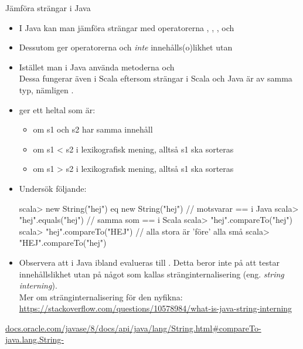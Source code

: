\begin{Slide}{Jämföra strängar i Java}\SlideFontTiny
\begin{itemize}
\item I Java kan man  jämföra strängar med operatorerna \code{<}, \code{<=}, \code{>}, och \code{>=}

\item Dessutom ger operatorerna \code{==} och \code{!=} \emph{inte} innehålls(o)likhet utan  \code{:(}

\item Istället  man i Java använda metoderna  och 
\\Dessa fungerar även i Scala eftersom strängar i Scala och Java är av samma typ, nämligen .
\pause
\item {} ger ett heltal som är:
\begin{itemize}\SlideFontTiny
\item {} om s1 och s2 har samma innehåll
\item {} om s1 < s2 i lexikografisk mening, alltså s1 ska sorteras 
\item {} om s1 > s2 i lexikografisk mening, alltså s1 ska sorteras 
\end{itemize}

\pause
\item Undersök följande:
\begin{REPL}
scala> new String("hej") eq new String("hej") // motsvarar == i Java
scala> "hej".equals("hej")                    // samma som == i Scala
scala> "hej".compareTo("hej")
scala> "hej".compareTo("HEJ")         // alla stora är 'före' alla små
scala> "HEJ".compareTo("hej")
\end{REPL}

\item Observera att  i Java ibland evalueras till . Detta beror inte på att \code{==} testar innehållslikhet utan på något som kallas stränginternalisering (eng. \textit{string interning}). \\
Mer om stränginternalisering för den nyfikna: \\
\href{https://stackoverflow.com/questions/10578984/what-is-java-string-interning}{https://stackoverflow.com/questions/10578984/what-is-java-string-interning}

\end{itemize}

\href{http://docs.oracle.com/javase/8/docs/api/java/lang/String.html#compareTo-java.lang.String-}{docs.oracle.com/javase/8/docs/api/java/lang/String.html\#compareTo-java.lang.String-}
\end{Slide}


